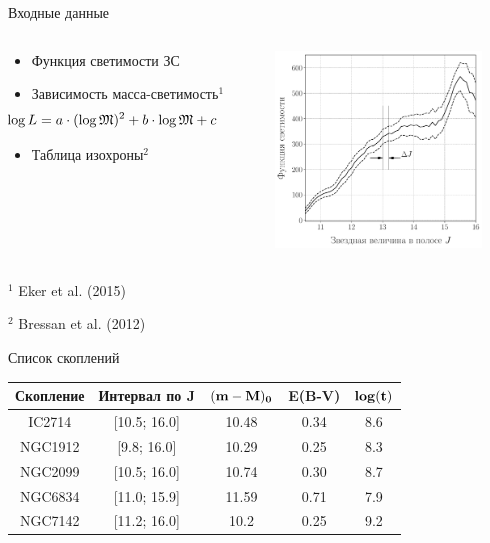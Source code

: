 \documentclass[pdf]{beamer}
\begin{document}
	\begin{frame}{Входные данные}
		\begin{columns}
			\begin{column}{0.6\textwidth}
   				\begin{itemize}
					\item Функция светимости ЗС
					\item<2-> Зависимость масса-светимость$^1$
				\begin{equation*} \hspace{-1.5cm}
				\log L=a \cdot (\log\mathfrak{M})^2+b \cdot \log\mathfrak{M}+c
				\end{equation*}
					\item<3-> Таблица изохроны$^2$
				\end{itemize}
			\end{column}
			
			\begin{column}{0.8\textwidth}
				\hspace{-0.5cm}
				\vspace{-1.9cm}				
    			\includegraphics[width=5.5cm]{images/LF}
			\end{column}
		\end{columns}
		
		\vspace{1cm}
		 {\footnotesize $^1$ Eker et al. (2015)}
		
		 {\footnotesize $^2$ Bressan et al. (2012)}
	\end{frame}
	
	\begin{frame}{Список скоплений}
	\centering
		\begin{tabular}{|c|c|c|c|c|}
			\hline
				\bf{Скопление} & \bf{Интервал по J}& $\bf{(m-M)_0}$ & \bf{E(B-V)} & $\bf{log(t)}$\\
			\hline
			IC2714 & [10.5; 16.0] & 10.48 & 0.34 & 8.6\\
			NGC1912 & [9.8;  16.0] & 10.29 & 0.25 & 8.3\\
			NGC2099 & [10.5;  16.0] & 10.74 & 0.30 & 8.7\\
			NGC6834 & [11.0;  15.9] & 11.59 & 0.71 & 7.9\\
			NGC7142 & [11.2;  16.0] & 10.2 & 0.25 & 9.2\\
			\hline
		\end{tabular}
	\end{frame}
	
\end{document}
